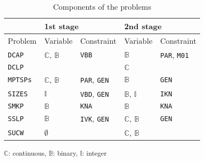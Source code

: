 \begin{table}[H]
	\centering
	\caption{Components of the problems}
	\label{table:prob_class}
	\begin{threeparttable}
		\begin{tabular}{@{}lllll@{}}
			\toprule
			& \multicolumn{2}{l}{1st stage}                              				  	& \multicolumn{2}{l}{2nd stage}                             			        \\ \midrule
			Problem 	     & Variable                    & Constraint                   	& Variable                    & Constraint                  				    \\ \midrule
			\texttt{DCAP}    & $\mathbb{C}$, $\mathbb{B}$  & \texttt{VBB}                	& $\mathbb{B}$                & \texttt{PAR}, \texttt{M01} 			    		\\
			\texttt{DCLP}	 &							   &								& $\mathbb{C}$			 	  &													\\				
			\texttt{MPTSPs}  & $\mathbb{C}$, $\mathbb{B}$  & \texttt{PAR}, \texttt{GEN}		& $\mathbb{B}$                & \texttt{GEN}               						\\
			\texttt{SIZES}   & $\mathbb{I}$ 			   & \texttt{VBD}, \texttt{GEN} 	& $\mathbb{B}$, $\mathbb{I}$  & \texttt{IKN}             						\\
			\texttt{SMKP}    & $\mathbb{B}$                & \texttt{KNA}                	& $\mathbb{B}$                & \texttt{KNA}              						\\
			\texttt{SSLP}    & $\mathbb{B}$                & \texttt{IVK}, \texttt{GEN} 	& $\mathbb{C}$, $\mathbb{B}$  & \texttt{GEN}             						\\
			\texttt{SUCW}    & $\emptyset$                 &                              	& $\mathbb{C}$, $\mathbb{B}$  &                             					\\ \bottomrule
		\end{tabular}
		
		\begin{tablenotes}
			\small
			\item $\mathbb{C}$: continuous, $\mathbb{B}$: binary, $\mathbb{I}$: integer
		\end{tablenotes}
	\end{threeparttable}
\end{table}


